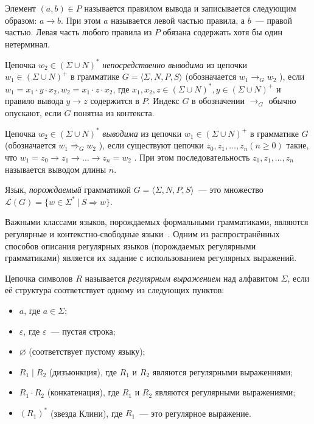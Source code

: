 Элемент $(a, b) \in P$ называется правилом вывода и записывается следующим образом: $a \rightarrow b$. При этом $a$ называется левой частью правила, а $b$~--- правой частью. Левая часть любого правила из $P$ обязана содержать хотя бы один нетерминал.


\begin{definition}    
Цепочка $w_2 \in  ( \Sigma \cup  N )^*$ \textit{непосредственно выводима} из цепочки   $w_1 \in ( \Sigma \cup N )^+$ в грамматике $G=\langle \Sigma, N, P, S \rangle$  (обозначается  $w_1 \rightarrow_G w_2$ ), если  $w_1 = x_1 \cdot y \cdot x_2, w_2 = x_1 \cdot z \cdot x_2$, где $x_1, x_2, z \in   (\Sigma \cup N )^*, y \in  (\Sigma \cup N )^+$ и правило вывода  $y \rightarrow z$  содержится в $P$. Индекс $G$ в обозначении $\rightarrow_G$ обычно опускают, если $G$ понятна из контекста.
	
Цепочка $w_2 \in  (\Sigma \cup  N )^*$  \textit{выводима} из цепочки  $w_1 \in (\Sigma \cup  N)^+$ в грамматике $G$  (обозначается  $w_1 \Rightarrow_G w_2$ ), если существуют цепочки $z_0, z_1, \ldots, z_n  (n \geq 0)$ такие, что $w_1 = z_0 \rightarrow z_1 \rightarrow \ldots \rightarrow z_n = w_2$ . При этом последовательность $z_0, z_1, \ldots, z_n$ называется выводом длины $n$.
\end{definition}

\begin{definition}  
	Язык, \textit{порождаемый} грамматикой $G = \langle \Sigma, N, P, S \rangle$~--- это множество $\mathcal{L}(G)  = \{ w \in \Sigma^*~|~S \Rightarrow w \}$.
\end{definition}

Важными классами языков, порождаемых формальными грамматиками, являются регулярные и контекстно-свободные языки~\cite{aho1973theory}. Одним из распространённых способов описания регулярных языков (порождаемых регулярными грамматиками) является их задание с использованием регулярных выражений.

\begin{definition}
Цепочка символов $R$ называется \textit{регулярным выражением} над алфавитом $\Sigma$, если её структура соответствует одному из следующих пунктов:
\begin{itemize}
    \item $a$, где $a \in \Sigma$;
    \item $\varepsilon$, где $\varepsilon$~--- пустая строка;
    \item $\varnothing$ (соответствует пустому языку);
    \item $R_1 \mid R_2$ (дизъюнкция), где $R_1$ и $R_2$ являются регулярными выражениями;
    \item $R_1 \cdot R_2$ (конкатенация), где $R_1$ и $R_2$ являются регулярными выражениями;
    \item $(R_1)^*$ (звезда Клини), где $R_1$~--- это регулярное выражение.
\end{itemize}
\end{definition}

